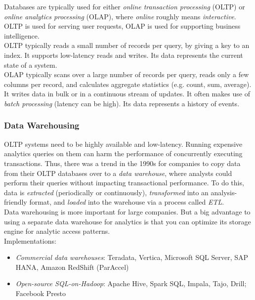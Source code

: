 \documentclass[12pt, titlepage]{article}
\begin{document}
Databases are typically used for either \textit{online transaction processing} (OLTP) or \textit{online analytics processing} (OLAP), where \textit{online} roughly means \textit{interactive}. OLTP is used for serving user requests, OLAP is used for supporting business intelligence. \\

OLTP typically reads a small number of records per query, by giving a key to an index. It supports low-latency reads and writes. Its data represents the current state of a system. \\

OLAP typically scans over a large number of records per query, reads only a few columns per record, and calculates aggregate statistics (e.g. count, sum, average). It writes data in bulk or in a continuous stream of updates. It often makes use of \textit{batch processing} (latency can be high). Its data represents a history of events.

\subsubsection{Data Warehousing}

OLTP systems need to be highly available and low-latency. Running expensive analytics queries on them can harm the performance of concurrently executing transactions. Thus, there was a trend in the 1990s for companies to copy data from their OLTP databases over to a \textit{data warehouse}, where analysts could perform their queries without impacting transactional performance. To do this, data is \textit{extracted} (periodically or continuously), \textit{transformed} into an analysis-friendly format, and \textit{loaded} into the warehouse via a process called \textit{ETL}. \\

Data warehousing is more important for large companies. But a big advantage to using a separate data warehouse for analytics is that you can optimize its storage engine for analytic access patterns. \\

Implementations:
\begin{itemize}
    \item \textit{Commercial data warehouses}: Teradata, Vertica, Microsoft SQL Server, SAP HANA, Amazon RedShift (ParAccel)
    \item \textit{Open-source SQL-on-Hadoop}: Apache Hive, Spark SQL, Impala, Tajo, Drill; Facebook Presto
\end{itemize}
\end{document}

